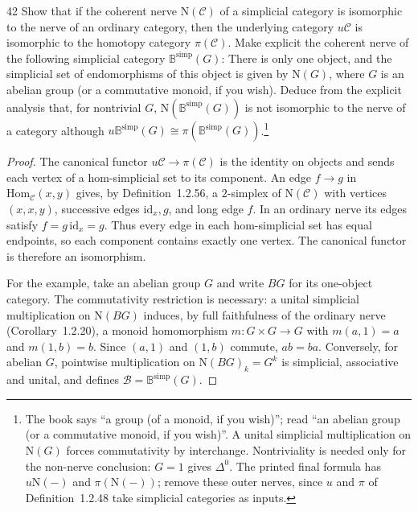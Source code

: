\begin{exercise}{42}
Show that if the coherent nerve $\mathrm{N}(\mathcal C)$ of a simplicial category is isomorphic
to the nerve of an ordinary category, then the underlying category $u\mathcal C$ is isomorphic
to the homotopy category $\pi(\mathcal C)$. Make explicit the coherent nerve of the following simplicial
category $\mathbb B^{\mathrm{simp}}(G)$: There is only one object, and the simplicial set of endomorphisms of
this object is given by $\mathrm{N}(G)$, where $G$ is an abelian group (or a commutative monoid, if you wish). Deduce from
the explicit analysis that, for nontrivial $G$, $\mathrm{N}(\mathbb B^{\mathrm{simp}}(G))$ is not isomorphic to the nerve of a category although
$u\mathbb B^{\mathrm{simp}}(G)\cong\pi(\mathbb B^{\mathrm{simp}}(G))$.\footnote{The book says ``a group (of a monoid, if you wish)'';
read ``an abelian group (or a commutative monoid, if you wish)''.
A unital simplicial multiplication on $\mathrm{N}(G)$ forces commutativity by interchange.
Nontriviality is needed only for the non-nerve conclusion: $G=1$ gives $\Delta^0$.
The printed final formula has $u\mathrm{N}(-)$ and $\pi(\mathrm{N}(-))$;
remove these outer nerves, since $u$ and $\pi$ of Definition~1.2.48 take simplicial categories as inputs.}

\begin{proof}
The canonical functor $u\mathcal C\to\pi(\mathcal C)$ is
the identity on objects and sends each vertex of a hom-simplicial
set to its component. An edge $f\to g$ in $\mathrm{Hom}_{\mathcal C}(x,y)$
gives, by Definition~1.2.56, a $2$-simplex of $\mathrm{N}(\mathcal C)$
with vertices $(x,x,y)$, successive edges $\mathrm{id}_x,g$,
and long edge $f$.
In an ordinary nerve its edges satisfy $f=g\,\mathrm{id}_x=g$.
Thus every edge in each hom-simplicial set has equal endpoints,
so each component contains exactly one vertex.
The canonical functor is therefore an isomorphism.

For the example, take an abelian group $G$ and write $BG$
for its one-object category.
The commutativity restriction is necessary: a unital simplicial
multiplication on $\mathrm{N}(BG)$ induces, by full faithfulness
of the ordinary nerve (Corollary~1.2.20), a monoid homomorphism
$m\colon G\times G\to G$ with $m(a,1)=a$ and $m(1,b)=b$.
Since $(a,1)$ and $(1,b)$ commute, $ab=ba$.
Conversely, for abelian $G$, pointwise multiplication on
$\mathrm{N}(BG)_k=G^k$ is simplicial, associative and unital,
and defines $\mathcal B=\mathbb B^{\mathrm{simp}}(G)$.


\end{proof}
\end{exercise}
